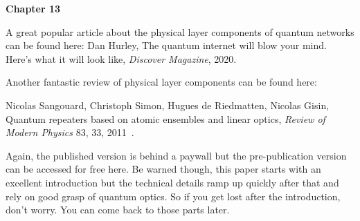 {\bf Chapter 13}

A great popular article about the physical layer components of quantum networks can be found here:
Dan Hurley, The quantum internet will blow your mind. Here’s what it will look like, \emph{Discover Magazine}, 2020.

Another fantastic review of physical layer components can be found here:

Nicolas Sangouard, Christoph Simon, Hugues de Riedmatten, Nicolas Gisin, Quantum repeaters based on atomic ensembles and linear optics, \emph{Review of Modern Physics} 83, 33, 2011~\cite{sangouard2011quantum}.

Again, the published version is behind a paywall but the pre-publication version can be accessed for free here. Be warned though, this paper starts with an excellent introduction but the technical details ramp up quickly after that and rely on good grasp of quantum optics. So if you get lost after the introduction, don’t worry. You can come back to those parts later.
